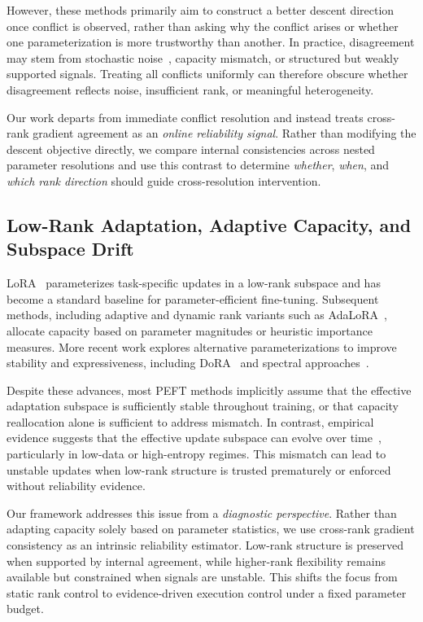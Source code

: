 \documentclass{article}
\begin{document}
However, these methods primarily aim to construct a better descent direction
once conflict is observed, rather than asking why the conflict arises or whether
one parameterization is more trustworthy than another.
In practice, disagreement may stem from stochastic noise~\cite{yin2018gradient},
capacity mismatch, or structured but weakly supported signals.
Treating all conflicts uniformly can therefore obscure whether disagreement
reflects noise, insufficient rank, or meaningful heterogeneity.

Our work departs from immediate conflict resolution and instead treats
cross-rank gradient agreement as an \emph{online reliability signal}.
Rather than modifying the descent objective directly,
we compare internal consistencies across nested parameter resolutions
and use this contrast to determine \emph{whether}, \emph{when}, and
\emph{which rank direction} should guide cross-resolution intervention.

\subsection{Low-Rank Adaptation, Adaptive Capacity, and Subspace Drift}

LoRA~\cite{hu2022lora} parameterizes task-specific updates in a low-rank subspace
and has become a standard baseline for parameter-efficient fine-tuning.
Subsequent methods, including adaptive and dynamic rank variants such as
AdaLoRA~\cite{zhang2023adalora}, allocate capacity based on parameter magnitudes
or heuristic importance measures.
More recent work explores alternative parameterizations to improve stability
and expressiveness, including DoRA~\cite{liu2024dora} and spectral approaches~\cite{wang2024svft}.

Despite these advances, most PEFT methods implicitly assume that the effective
adaptation subspace is sufficiently stable throughout training,
or that capacity reallocation alone is sufficient to address mismatch.
In contrast, empirical evidence suggests that the effective update subspace
can evolve over time~\cite{aghajanyan2021intrinsic},
particularly in low-data or high-entropy regimes.
This mismatch can lead to unstable updates when low-rank structure
is trusted prematurely or enforced without reliability evidence.

Our framework addresses this issue from a \emph{diagnostic perspective}.
Rather than adapting capacity solely based on parameter statistics,
we use cross-rank gradient consistency as an intrinsic reliability estimator.
Low-rank structure is preserved when supported by internal agreement,
while higher-rank flexibility remains available but constrained when signals are
unstable.
This shifts the focus from static rank control to evidence-driven execution
control under a fixed parameter budget.
\end{document}
